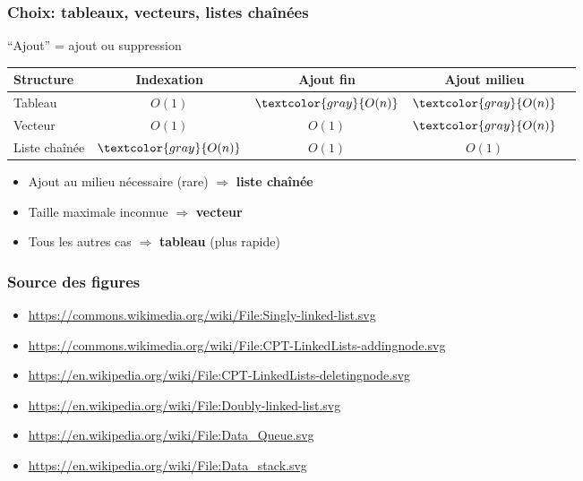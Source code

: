 \documentclass[12pt]{beamer}
\newcommand{\gray}{\textcolor{gray}}
\newcommand{\On}{\gray{O(n)}}
\begin{document}
\begin{frame}
\frametitle{Choix: tableaux, vecteurs, listes chaînées}
``Ajout'' = ajout ou suppression
\begin{center}
\begin{tabu}{l|cccc}
\toprule
Structure & Indexation & Ajout fin & Ajout milieu \\
\midrule
Tableau & $O(1)$ & $\On$ & $\On$ \\
Vecteur & $O(1)$ & $O(1)$ & $\On$ \\
Liste chaînée & $\On$ & $O(1)$ & $O(1)$ \\
\bottomrule
\end{tabu}
\end{center}
\begin{itemize}
\item Ajout au milieu nécessaire (rare) $\Rightarrow$ \textbf{liste chaînée}
\item Taille maximale inconnue $\Rightarrow$ \textbf{vecteur}
\item Tous les autres cas $\Rightarrow$ \textbf{tableau} (plus rapide)
\end{itemize}
\end{frame}

\begin{frame}
\frametitle{Source des figures}
\begin{itemize}
\item \url{https://commons.wikimedia.org/wiki/File:Singly-linked-list.svg}
\item \url{https://commons.wikimedia.org/wiki/File:CPT-LinkedLists-addingnode.svg}
\item \url{https://en.wikipedia.org/wiki/File:CPT-LinkedLists-deletingnode.svg}
\item \url{https://en.wikipedia.org/wiki/File:Doubly-linked-list.svg}
\item \url{https://en.wikipedia.org/wiki/File:Data_Queue.svg}
\item \url{https://en.wikipedia.org/wiki/File:Data_stack.svg}
\end{itemize}
\end{frame}
\end{document}
